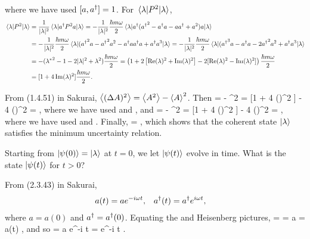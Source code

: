 \begin{solution}
\begin{align}
	\end{align}
	where we have used $[a, a^\dagger] = 1$.  For $\ev{P^2}{\lam}$,
	\begin{align}
		\ev{P^2}{\lam} &= \frac{1}{|\lam|^2} \ev{\ad P^2 a}{\lam}
		= -\frac{1}{|\lam|^2} \frac{\hbar m \omega}{2} \ev{\ad ({\ad}^2 - \ad a - a \ad + a^2) a}{\lam} \notag \\
		&= -\frac{1}{|\lam|^2} \frac{\hbar m \omega}{2} \ev{({\ad}^2 a - {\ad}^2 a^2 - \ad a \ad a + \ad a^3}{\lam}
		= -\frac{1}{|\lam|^2} \frac{\hbar m \omega}{2} \ev{({\ad}^3 a - \ad a - 2 {\ad}^2 a^2 + \ad a^3}{\lam} \notag \\
		&= -({\lam^*}^2 - 1 - 2 |\lam|^2 + \lam^2) \frac{\hbar m \omega}{2}
		= \left( 1 + 2 \left[ \Re(\lam)^2 + \Im(\lam)^2 \right] - 2 [\Re(\lam)^2 - \Im(\lam)^2] 
\right) \frac{\hbar m \omega}{2} \notag \\
		&= [1 + 4 \Im(\lam)^2] \frac{\hbar m \omega}{2}. \label{evPsq}
	\end{align}
	
	From (1.4.51) in Sakurai, $\ev{(\DA)^2} = \ev{A^2} - \ev{A}^2$.  Then
	\beq
		 =  - ^2 = [1 + 4 \Re(\lam)^2 ]  - 4 \Re(\lam)^2  = ,
	\eeq
	where we have used  and , and
	\beq
		 =  - ^2 = [1 + 4 \Im(\lam)^2 ]  - 4 \Im(\lam)^2  = ,
	\eeq
	where we have used  and .  Finally,
	\beq
		  = ,
	\eeq
	which shows that the coherent state $\ket{\lambda}$ satisfies the minimum uncertainty relation.
\end{solution}


\newcommand{\psit}{\psi(t)}
\newcommand{\kpsit}{\ket{\psit}}
\newcommand{\Ut}{U(t)}

\begin{problem} \label{timeevo}
	Starting from $\ket{\psi(0)} = \ket{\lambda}$ at $t = 0$, we let $\kpsit$ evolve in time.  What is the state $\kpsit$ for $t > 0$?
\end{problem}

\begin{solution}
	From (2.3.43) in Sakurai,
	\begin{align*}
		a(t) &= a e^{-i \omega t}, &
		a^\dagger(t) &= a^\dagger e^{i \omega t},
	\end{align*}
	where $a = a(0)$ and $a^\dagger = a^\dagger(0)$.  Equating the {\Schrodinger} and Heisenberg pictures,
	\beq
		 = \klam =  a \klam \implies \kpsit =  a(t) \klam,
	\eeq
	and so
	\beq
		\kpsit =  a e^{-i \omega t} \klam = e^{-i \omega t} \klam.
	\eeq
\end{solution}

